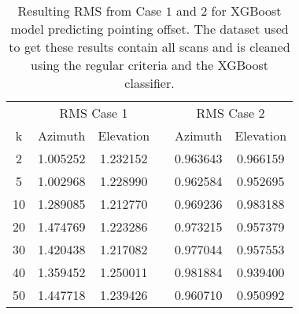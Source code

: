 \begin{table}[h]
    \centering %
    \caption{Resulting RMS from Case $1$ and $2$ for XGBoost model predicting pointing offset.
    The dataset used to get these results contain all scans and is cleaned using the regular criteria and the XGBoost classifier.}
    \begin{tabular}{ccc c cc}
        \toprule
        \multicolumn{1}{c}{} & \multicolumn{2}{c}{RMS Case 1} & & \multicolumn{2}{c}{RMS Case 2} \\
        \cmidrule(lr){2-3} \cmidrule(lr){5-6}
         k & Azimuth & Elevation & & Azimuth & Elevation \\
        \midrule
        2 &  1.005252 &  1.232152 & &  0.963643 &  0.966159 \\
        5 &  1.002968 &  1.228990 & &  0.962584 &  0.952695 \\
       10 &  1.289085 &  1.212770 & &  0.969236 &  0.983188 \\
       20 &  1.474769 &  1.223286 & &  0.973215 &  0.957379 \\
       30 &  1.420438 &  1.217082 & &  0.977044 &  0.957553 \\
       40 &  1.359452 &  1.250011 & &  0.981884 &  0.939400 \\
       50 &  1.447718 &  1.239426 & &  0.960710 &  0.950992 \\
        \bottomrule
    \end{tabular}
\end{table}

